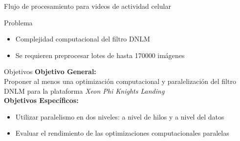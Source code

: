 \documentclass[15pt]{beamer} %
\begin{document}
\begin{frame}{Flujo de procesamiento para videos de actividad celular}
\begin{center}
\end{center}
\end{frame}

\begin{frame}{Problema}
  
  \begin{itemize}
  \item Complejidad computacional del filtro DNLM
  \item Se requieren preprocesar lotes de hasta 170000 im\'agenes
  \end{itemize}
\end{frame}

\begin{frame}{Objetivos}
\textbf{Objetivo General:} \\ Proponer al menos una optimización computacional y paralelización del filtro DNLM  para la plataforma \textit{Xeon Phi Knights Landing}
\vspace{3mm} \\
\textbf{Objetivos Espec\'ificos:} \\
  \begin{itemize}
  \item Utilizar paralelismo en dos niveles: a nivel de hilos y a nivel del datos
  \item Evaluar el rendimiento de las optimizaciones computacionales paralelas 
  \end{itemize}
\end{frame}
\end{document}
